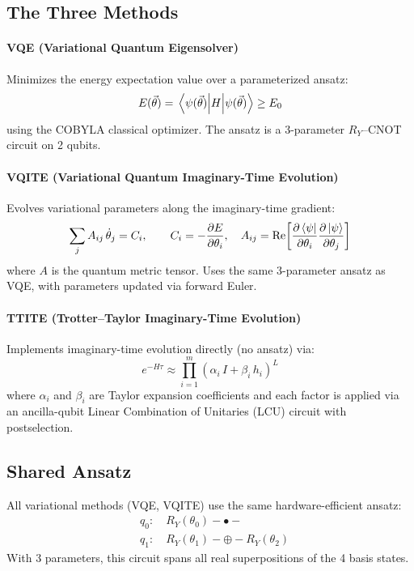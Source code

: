 \documentclass[11pt,a4paper]{article}
\begin{document}
\subsection{The Three Methods}

\paragraph{VQE (Variational Quantum Eigensolver)}
Minimizes the energy expectation value over a parameterized ansatz:
\begin{equation}
  E(\vec{\theta}) = \mel{\psi(\vec{\theta})}{H}{\psi(\vec{\theta})} \geq E_0
\end{equation}
using the COBYLA classical optimizer. The ansatz is a 3-parameter
$R_Y$--CNOT circuit on 2 qubits.

\paragraph{VQITE (Variational Quantum Imaginary-Time Evolution)}
Evolves variational parameters along the imaginary-time gradient:
\begin{equation}
  \sum_j A_{ij}\,\dot{\theta}_j = C_i, \qquad
  C_i = -\frac{\partial E}{\partial\theta_i}, \quad
  A_{ij} = \text{Re}\!\left[\frac{\partial\bra{\psi}}{\partial\theta_i}
    \frac{\partial\ket{\psi}}{\partial\theta_j}\right]
\end{equation}
where $A$ is the quantum metric tensor. Uses the same 3-parameter ansatz
as VQE, with parameters updated via forward Euler.

\paragraph{TTITE (Trotter--Taylor Imaginary-Time Evolution)}
Implements imaginary-time evolution directly (no ansatz) via:
\begin{equation}
  e^{-H\tau} \approx \prod_{i=1}^m \left(\alpha_i\,I + \beta_i\,h_i\right)^L
\end{equation}
where $\alpha_i$ and $\beta_i$ are Taylor expansion coefficients and each
factor is applied via an ancilla-qubit Linear Combination of Unitaries (LCU)
circuit with postselection.

\subsection{Shared Ansatz}

All variational methods (VQE, VQITE) use the same hardware-efficient ansatz:
\begin{equation}
  \begin{aligned}
  &q_0: \quad R_Y(\theta_0) - \bullet - \\
  &q_1: \quad R_Y(\theta_1) - \oplus - R_Y(\theta_2)
  \end{aligned}
\end{equation}
With 3 parameters, this circuit spans all real superpositions of the 4 basis states.
\end{document}
